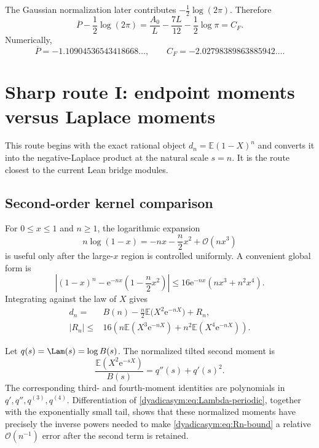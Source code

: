 \documentclass[11pt,oneside]{article}
\theoremstyle{definition}
\theoremstyle{remark}
\newcommand{\e}{\mathrm e}
\newcommand{\E}{\mathbb E}
\newcommand{\bigO}{\mathcal O}
\begin{document}
The Gaussian normalization later contributes $-\tfrac12\log(2\pi)$.  Therefore
\begin{equation}
 \overline P-\frac12\log(2\pi)
 =\frac{A_0}{L}-\frac{7L}{12}-\frac12\log\pi
 =C_F.                                                       \label{dyadicasym:eq:CF-from-P}
\end{equation}
Numerically,
\begin{equation}
 \overline P=-1.10904536543418668\ldots,
 \qquad
 C_F=-2.02798389863885942\ldots.                            \label{dyadicasym:eq:constants-numeric}
\end{equation}

\section{Sharp route I: endpoint moments versus Laplace moments}
\label{dyadicasym:sec:endpoint-laplace}

This route begins with the exact rational object $d_n=\E(1-X)^n$ and converts it into the
negative-Laplace product at the natural scale $s=n$.  It is the route closest to the current
Lean bridge modules.

\subsection{Second-order kernel comparison}

For $0\le x\le1$ and $n\ge1$, the logarithmic expansion
\begin{equation*}
 n\log(1-x)=-nx-\frac n2x^2+\bigO(nx^3)
\end{equation*}
is useful only after the large-$x$ region is controlled uniformly.  A convenient global
form is
\begin{equation}
 \left|(1-x)^n-\e^{-nx}\left(1-\frac n2x^2\right)\right|
 \le16\e^{-nx}(nx^3+n^2x^4).                               \label{dyadicasym:eq:kernel-comparison}
\end{equation}
Integrating against the law of $X$ gives
\begin{align}
 d_n={}&B(n)-\frac n2\E\bigl(X^2\e^{-nX}\bigr)+R_n,        \label{dyadicasym:eq:dn-B-second}\\
 |R_n|\le{}&16\left(
 n\E(X^3\e^{-nX})+n^2\E(X^4\e^{-nX})\right).              \label{dyadicasym:eq:Rn-bound}
\end{align}

Let $q(s)=\Lam(s)=\log B(s)$.  The normalized tilted second moment is
\begin{equation}
 \frac{\E(X^2\e^{-sX})}{B(s)}=q''(s)+q'(s)^2.               \label{dyadicasym:eq:tilted-second}
\end{equation}
The corresponding third- and fourth-moment identities are polynomials in
$q',q'',q^{(3)},q^{(4)}$.  Differentiation of \eqref{dyadicasym:eq:Lambda-periodic}, together with the
exponentially small tail, shows that these normalized moments have precisely the inverse
powers needed to make \eqref{dyadicasym:eq:Rn-bound} a relative $\bigO(n^{-1})$ error after the second
term is retained.
\end{document}

